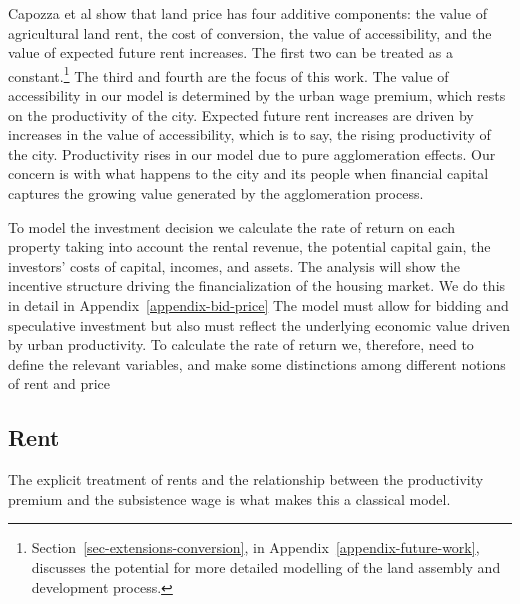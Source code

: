 Capozza et al \cite{capozzaFundamentalsLandPrices1989} show that land price has four additive components: the value of agricultural land rent, the cost of conversion, the value of accessibility, and the value of expected future rent increases. The first two can be treated as a constant.\footnote{Section~\ref{sec-extensions-conversion}, in Appendix~\ref{appendix-future-work}, discusses the potential for more detailed modelling of the land assembly and development process.} The third and fourth are the focus of this work. The value of accessibility in our model is determined by the urban wage premium, which rests on the productivity of the city. Expected future rent increases are driven by increases in the value of accessibility, which is to say, the rising productivity of the city. Productivity rises in our model due to pure agglomeration effects. Our concern is with what happens to the city and its people when financial capital captures the growing value generated by the agglomeration process.  

To model the investment decision  we calculate the \gls{rate of return} on each property taking into account the rental revenue, the potential capital gain, the investors' costs of capital, incomes, and assets. The analysis will show the incentive structure driving the  financialization of the housing market. We do this in detail in Appendix~\ref{appendix-bid-price} 
The model must  allow for bidding and speculative investment but also must reflect the underlying economic value driven by urban productivity. To calculate the \gls{rate of return} we, therefore, need to define the relevant variables, and make some distinctions among different notions of rent and price %



\subsection{Rent} \label{section-rent}
The explicit treatment of rents and the relationship between the productivity \gls{premium} and the \gls{subsistence wage} is what makes this a \gls{classical} model. 

